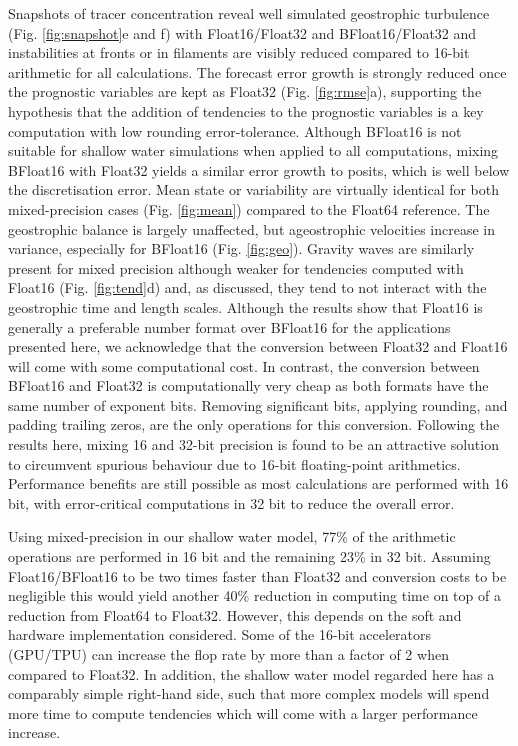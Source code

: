 Snapshots of tracer concentration reveal well simulated geostrophic turbulence (Fig. \ref{fig:snapshot}e and f) with Float16/Float32
and BFloat16/Float32 and instabilities at fronts or in filaments are visibly reduced compared to 16-bit arithmetic for all calculations.
The forecast error growth is strongly reduced once the prognostic variables are kept as Float32 (Fig. \ref{fig:rmse}a), supporting the
hypothesis that the addition of tendencies to the prognostic variables is a key computation with low rounding error-tolerance. Although
BFloat16 is not suitable for shallow water simulations when applied to all computations, mixing BFloat16 with Float32 yields a similar error
growth to posits, which is well below the discretisation error. Mean state or variability are virtually identical for both mixed-precision cases
(Fig. \ref{fig:mean}) compared to the Float64 reference. The geostrophic balance is largely unaffected, but ageostrophic velocities
increase in variance, especially for BFloat16 (Fig. \ref{fig:geo}). Gravity waves are similarly present for mixed precision although weaker
for tendencies computed with Float16 (Fig. \ref{fig:tend}d) and, as discussed, they tend to not interact with the geostrophic time and
length scales. Although the results show that Float16 is generally a preferable number format over BFloat16 for the applications presented
here, we acknowledge that the conversion between Float32 and Float16 will come with some computational cost. In contrast, the
conversion between BFloat16 and Float32 is computationally very cheap as both formats have the same number of exponent bits.
Removing significant bits, applying rounding, and padding trailing zeros, are the only operations for this conversion. Following the
results here, mixing 16 and 32-bit precision is found to be an attractive solution to circumvent spurious behaviour due to 16-bit
floating-point arithmetics. Performance benefits are still possible as most calculations are performed with 16 bit, with error-critical
computations in 32 bit to reduce the overall error.

Using mixed-precision in our shallow water model, 77\% of the arithmetic operations are performed in 16 bit and the remaining
23\% in 32 bit. Assuming Float16/BFloat16 to be two times faster than Float32 and conversion costs to be negligible this would
yield another 40\% reduction in computing time on top of a reduction from Float64 to Float32. However, this depends on the soft
and hardware implementation considered. Some of the 16-bit accelerators (GPU/TPU) can increase the flop rate by more than a
factor of 2 when compared to Float32. In addition, the shallow water model regarded here has a comparably simple right-hand side,
such that more complex models will spend more time to compute tendencies which will come with a larger performance increase.

